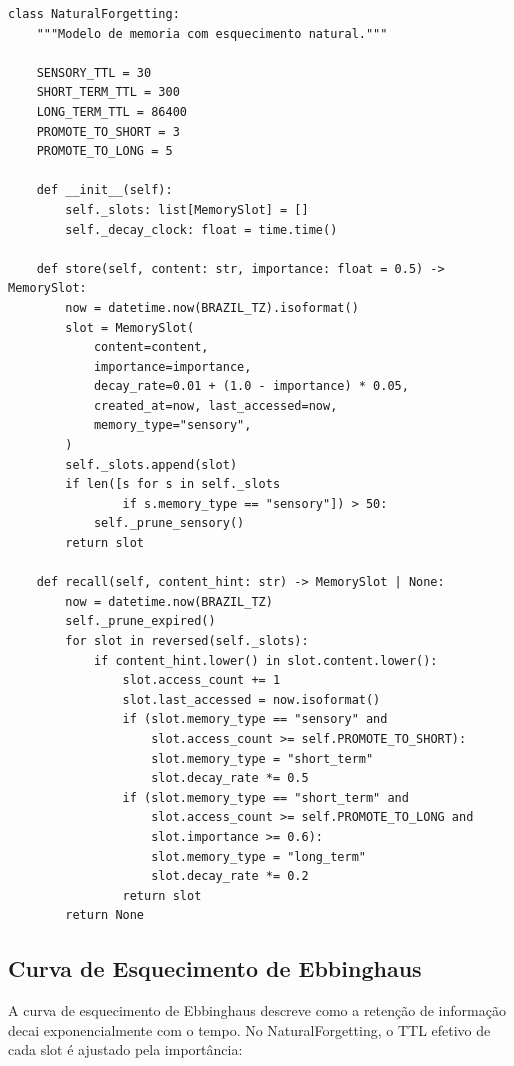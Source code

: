 \begin{lstlisting}[style=pythonstyle, caption={NaturalForgetting: modelo Atkinson-Shiffrin (trust\_engine.py:280-395)}]
class NaturalForgetting:
    """Modelo de memoria com esquecimento natural."""

    SENSORY_TTL = 30
    SHORT_TERM_TTL = 300
    LONG_TERM_TTL = 86400
    PROMOTE_TO_SHORT = 3
    PROMOTE_TO_LONG = 5

    def __init__(self):
        self._slots: list[MemorySlot] = []
        self._decay_clock: float = time.time()

    def store(self, content: str, importance: float = 0.5) -> MemorySlot:
        now = datetime.now(BRAZIL_TZ).isoformat()
        slot = MemorySlot(
            content=content,
            importance=importance,
            decay_rate=0.01 + (1.0 - importance) * 0.05,
            created_at=now, last_accessed=now,
            memory_type="sensory",
        )
        self._slots.append(slot)
        if len([s for s in self._slots
                if s.memory_type == "sensory"]) > 50:
            self._prune_sensory()
        return slot

    def recall(self, content_hint: str) -> MemorySlot | None:
        now = datetime.now(BRAZIL_TZ)
        self._prune_expired()
        for slot in reversed(self._slots):
            if content_hint.lower() in slot.content.lower():
                slot.access_count += 1
                slot.last_accessed = now.isoformat()
                if (slot.memory_type == "sensory" and
                    slot.access_count >= self.PROMOTE_TO_SHORT):
                    slot.memory_type = "short_term"
                    slot.decay_rate *= 0.5
                if (slot.memory_type == "short_term" and
                    slot.access_count >= self.PROMOTE_TO_LONG and
                    slot.importance >= 0.6):
                    slot.memory_type = "long_term"
                    slot.decay_rate *= 0.2
                return slot
        return None
\end{lstlisting}

\subsection{Curva de Esquecimento de Ebbinghaus}

A curva de esquecimento de Ebbinghaus descreve como a retenção de
informação decai exponencialmente com o tempo. No NaturalForgetting,
o TTL efetivo de cada slot é ajustado pela importância:

